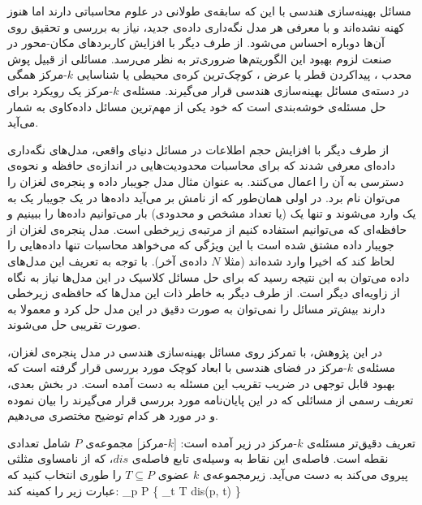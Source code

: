 


مسائل بهینه‌سازی هندسی  با این که سابقه‌ی طولانی در علوم محاسباتی دارند اما هنوز کهنه نشده‌اند و با معرفی هر مدل نگه‌داری داده‌ی جدید، نیاز به بررسی و تحقیق روی آن‌ها دوباره احساس می‌شود. از طرف دیگر با افزایش کاربردهای مکان-محور  در صنعت لزوم بهبود این الگوریتم‌ها ضروری‌تر به نظر می‌رسد. مسائلی از قبیل پوش محدب ، پیداکردن قطر  یا عرض ، کوچک‌ترین کره‌ی محیطی  یا شناسایی $k$-مرکز   همگی در دسته‌ی مسائل بهینه‌سازی هندسی قرار می‌گیرند. مسئله‌ی $k$-مرکز یک رویکرد برای حل مسئله‌ی خوشه‌بندی است که خود یکی از مهم‌ترین مسائل داده‌کاوی  به شمار می‌آید. 

از طرف دیگر با افزایش حجم اطلاعات در مسائل دنیای واقعی، مدل‌های نگه‌داری داده‌ای معرفی شدند که برای محاسبات محدودیت‌هایی در اندازه‌ی حافظه و نحوه‌ی دسترسی به آن را اعمال می‌کنند. به عنوان مثال مدل جویبار داده  و پنجره‌ی لغزان   را می‌توان نام برد. در اولی همان‌طور که از نامش بر می‌آید داده‌ها در یک جویبار یک به یک وارد می‌شوند و تنها یک (یا تعداد مشخص و محدودی) بار می‌توانیم داده‌ها را ببینیم و حافظه‌ای که می‌توانیم استفاده کنیم از مرتبه‌ی زیرخطی  است. مدل پنجره‌ی لغزان از جویبار داده مشتق شده است با این ویژگی که می‌خواهد محاسبات تنها داده‌هایی  را لحاظ کند که اخیرا وارد شده‌اند (مثلا $N$ داده‌ی آخر). با توجه به تعریف این مدل‌های داده می‌توان به این نتیجه رسید که برای حل مسائل کلاسیک در این مدل‌ها نیاز به نگاه از زاویه‌ای دیگر است. از طرف دیگر به خاطر ذات این مدل‌ها که حافظه‌ی زیرخطی دارند بیش‌تر مسائل را نمی‌توان به صورت دقیق در این مدل حل کرد و معمولا به صورت تقریبی حل می‌شوند.

در این پژوهش، با تمرکز روی مسائل بهینه‌سازی هندسی در مدل پنجره‌ی لغزان، مسئله‌ی $k$-مرکز در فضای هندسی با ابعاد کوچک مورد بررسی قرار گرفته است که بهبود قابل توجهی در ضریب تقریب این مسئله به دست آمده است.
در بخش بعدی، تعریف رسمی از مسائلی که در این پایان‌نامه مورد بررسی قرار می‌گیرند را بیان نموده و در مورد هر کدام توضیح مختصری می‌دهیم.


تعریف دقیق‌تر مسئله‌ی $k$-مرکز در زیر آمده است:
[$k$-مرکز]
مجموعه‌ی $P$ شامل تعدادی نقطه است. فاصله‌ی این نقاط به وسیله‌ی تابع فاصله‌ی $dis$، که از نامساوی مثلثی پیروی می‌کند به دست می‌آید.
زیرمجموعه‌ی $k$ عضوی $T \subseteq P$ را طوری انتخاب کنید که عبارت زیر را کمینه کند:
\max_{p \in P} \{ \min_{t \in T} dis(p, t) \}

